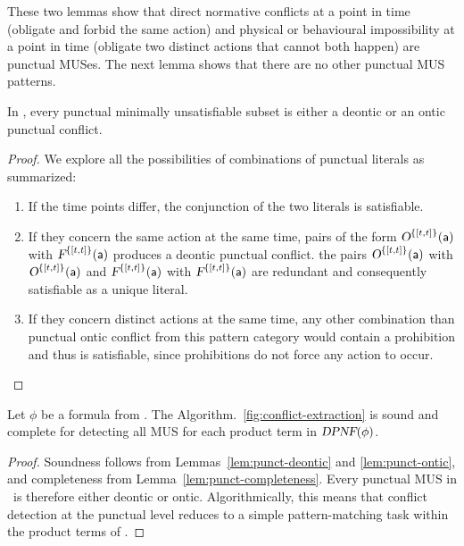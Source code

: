 These two lemmas show that direct normative conflicts at a point in time (obligate and forbid the same action) and physical or behavioural impossibility at a point in time (obligate two distinct actions that cannot both happen) are punctual MUSes. 
The next lemma shows that there are no other punctual MUS patterns.

\begin{lemma}\label{lem:punct-completeness}
In \TDDLfm, every punctual minimally unsatisfiable subset is either a deontic or an ontic punctual conflict.
\end{lemma}

\begin{proof}
We explore all the possibilities of combinations of punctual literals as summarized:

\begin{enumerate}
\item If the time points differ, the conjunction of the two literals is satisfiable.
\item If they concern the same action at the same time, pairs of the form $\textsl{O}^{\{[t,t]\}}(\mathsf{a})$ with $\textsl{F}^{\{[t,t]\}}(\mathsf{a})$
produces a deontic punctual conflict. the pairs \(\textsl{O}^{\{[t,t]\}}(\mathsf{a})\) with \(\textsl{O}^{\{[t,t]\}}(\mathsf{a})\) and 
\(\textsl{F}^{\{[t,t]\}}(\mathsf{a})\) with \(\textsl{F}^{\{[t,t]\}}(\mathsf{a})\) are redundant and consequently satisfiable as a unique literal.

\item If they concern distinct actions at the same time,  any other combination than punctual ontic conflict from this pattern category would contain a prohibition and thus is satisfiable, since prohibitions do not force any action to occur.
\end{enumerate}
\end{proof}

\begin{theorem}\label{thm:mus-structure}

Let $\phi$ be a formula from \TDDLfm. The Algorithm.~\ref{fig:conflict-extraction} is sound and complete for detecting all MUS for each product term in $\textsl{DPNF}(\phi)$.

\end{theorem}

\begin{proof}
Soundness follows from Lemmas~\ref{lem:punct-deontic} and \ref{lem:punct-ontic}, and completeness from Lemma~\ref{lem:punct-completeness}. 
Every punctual MUS in \TDDLfm\ is therefore either deontic or ontic. 
Algorithmically, this means that conflict detection at the punctual level reduces to a simple pattern-matching task within the product terms of \dpnf. 
\end{proof}





